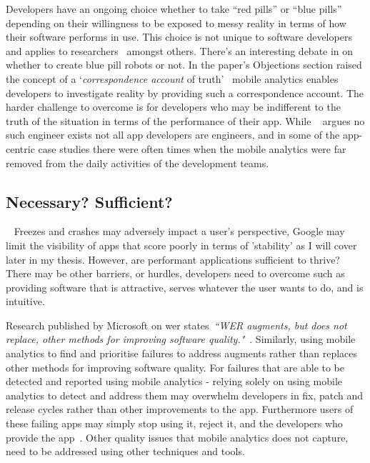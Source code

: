 Developers have an ongoing choice whether to take ``red pills'' or ``blue pills''~ depending on their willingness to be exposed to messy reality in terms of how their software performs in use. This choice is not unique to software developers and applies to researchers~ amongst others. There's an interesting debate in  on whether to create blue pill robots or not. In the paper's Objections section raised the concept of a `\emph{correspondence account} of truth'~ mobile analytics enables developers to investigate reality by providing such a correspondence account. The harder challenge to overcome is for developers who may be indifferent to the truth of the situation in terms of the performance of their app. While ~ argues no such engineer exists not all app developers are engineers, and in some of the app-centric case studies there were often times when the mobile analytics were far removed from the daily activities of the development teams.

\subsection{Necessary? Sufficient?}~\label{discussion-necessary-sufficient-topic}
Freezes and crashes may adversely impact a user's perspective, Google may limit the visibility of apps that score poorly in terms of 'stability' as I will cover later in my thesis. However, are performant applications sufficient to thrive? There may be other barriers, or hurdles, developers need to overcome such as providing software that is attractive, serves whatever the user wants to do, and is intuitive.

Research published by Microsoft on \Gls{wer} states~\emph{``WER augments, but does not replace, other methods for improving software quality."}~. Similarly, using mobile analytics to find and prioritise failures to address augments rather than replaces other methods for improving software quality. For failures that are able to be detected and reported using mobile analytics - relying solely on using mobile analytics to detect and address them may overwhelm developers in fix, patch and release cycles rather than other improvements to the app. Furthermore users of these failing apps may simply stop using it, reject it, and the developers who provide the app~. Other quality issues that mobile analytics does not capture, need to be addressed using other techniques and tools.

